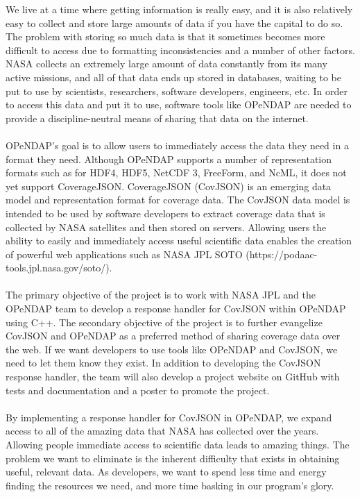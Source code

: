 \documentclass[onecolumn, draftclsnofoot,12pt, compsoc]{IEEEtran}
\begin{document}
We live at a time where getting information is really easy, and it is also relatively easy to collect and store large amounts of data if you have the capital to do so. The problem with storing so much data is that it sometimes becomes more difficult to access due to formatting inconsistencies and a number of other factors. NASA collects an extremely large amount of data constantly from its many active missions, and all of that data ends up stored in databases, waiting to be put to use by scientists, researchers, software developers, engineers, etc. In order to access this data and put it to use, software tools like OPeNDAP are needed to provide a discipline-neutral means of sharing that data on the internet.\\
\\
OPeNDAP’s goal is to allow users to immediately access the data they need in a format they need. Although OPeNDAP supports a number of representation formats such as for HDF4, HDF5, NetCDF 3, FreeForm, and NcML, it does not yet support CoverageJSON.
CoverageJSON (CovJSON) is an emerging data model and representation format for coverage data. The CovJSON data model is intended to be used by software developers to extract coverage data that is collected by NASA satellites and then stored on servers. Allowing users the ability to easily and immediately access useful scientific data enables the creation of powerful web applications such as NASA JPL SOTO (https://podaac-tools.jpl.nasa.gov/soto/).\\
\\
The primary objective of the project is to work with NASA JPL and the OPeNDAP team to develop a response handler for CovJSON within OPeNDAP using C++. The secondary objective of the project is to further evangelize CovJSON and OPeNDAP as a preferred method of sharing coverage data over the web. If we want developers to use tools like OPeNDAP and CovJSON, we need to let them know they exist. In addition to developing the CovJSON response handler, the team will also develop a project website on GitHub with tests and documentation and a poster to promote the project.\\
\\
By implementing a response handler for CovJSON in OPeNDAP, we expand access to all of the amazing data that NASA has collected over the years. Allowing people immediate access to scientific data leads to amazing things. The problem we want to eliminate is the inherent difficulty that exists in obtaining useful, relevant data. As developers, we want to spend less time and energy finding the resources we need, and more time basking in our program’s glory.\\
\\
\end{document}
